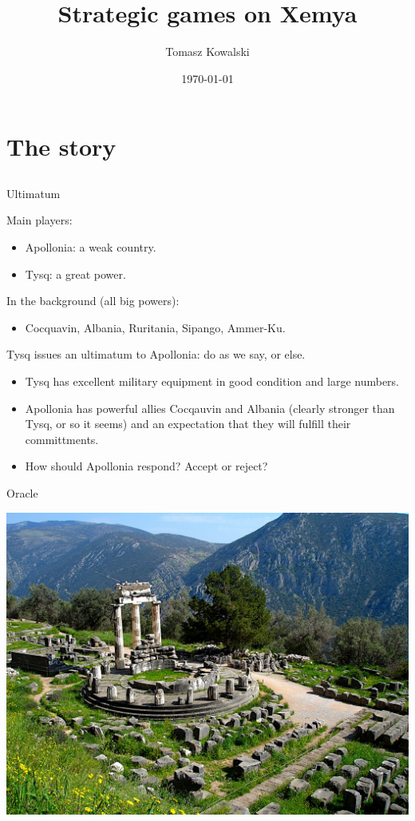 \documentclass[compress]{beamer}
\title{Strategic games on Xemya}
\author{Tomasz Kowalski}
\date{\today}
\begin{document}
\frame{\titlepage}

\section{The story}
\subsection{}

\begin{frame}{Ultimatum}

Main players:  
\begin{itemize}
\item Apollonia: a weak country.
\item Tysq: a great power.
\end{itemize}
In the background (all big powers):
\begin{itemize}
\item Cocquavin, Albania, Ruritania, Sipango, Ammer-Ku.  
\end{itemize}  

\begin{block}{Tysq issues an ultimatum to Apollonia: do as we say, or else.}
\begin{itemize}  
\item Tysq has excellent military equipment in good condition and
  large numbers. 
\item Apollonia has powerful allies Cocqauvin and Albania (clearly stronger than
Tysq, or so it seems) and an expectation that they will fulfill their
committments.
\item How should Apollonia respond? Accept or reject?
\end{itemize}  
\end{block}

\end{frame}

\begin{frame}{Oracle}

\includegraphics[scale=0.18]{Delphi-big.jpg}  

  
\end{frame}  
\end{document}
